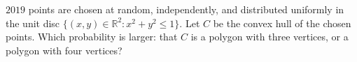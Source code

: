 \(2019\) points are chosen at random, independently, and distributed uniformly in the unit disc \(\{(x,y)\in\mathbb R^2: x^2+y^2\le 1\}\). Let \(C\) be the convex hull of the chosen points. Which probability is larger: that \(C\) is a polygon with three vertices, or a polygon with four vertices?

